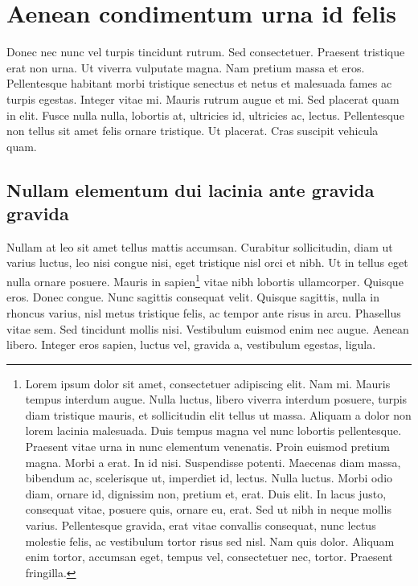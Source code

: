 \section{Aenean condimentum urna id felis}
Donec nec nunc vel turpis tincidunt rutrum. Sed consectetuer. Praesent tristique erat non urna. Ut viverra vulputate magna. Nam pretium massa et eros. Pellentesque habitant morbi tristique senectus et netus et malesuada fames ac turpis egestas. Integer vitae mi. Mauris rutrum augue et mi. Sed placerat quam in elit. Fusce nulla nulla, lobortis at, ultricies id, ultricies ac, lectus. Pellentesque non tellus sit amet felis ornare tristique. Ut placerat. Cras suscipit vehicula quam.

\subsection{Nullam elementum dui lacinia ante gravida gravida}
Nullam at leo sit amet tellus mattis accumsan. Curabitur sollicitudin, diam ut varius luctus, leo nisi congue nisi, eget tristique nisl orci et nibh. Ut in tellus eget nulla ornare posuere. Mauris in sapien\footnote{Lorem ipsum dolor sit amet, consectetuer adipiscing elit. Nam mi. Mauris tempus interdum augue. Nulla luctus, libero viverra interdum posuere, turpis diam tristique mauris, et sollicitudin elit tellus ut massa. Aliquam a dolor non lorem lacinia malesuada. Duis tempus magna vel nunc lobortis pellentesque. Praesent vitae urna in nunc elementum venenatis. Proin euismod pretium magna. Morbi a erat. In id nisi. Suspendisse potenti. Maecenas diam massa, bibendum ac, scelerisque ut, imperdiet id, lectus. Nulla luctus. Morbi odio diam, ornare id, dignissim non, pretium et, erat. Duis elit. In lacus justo, consequat vitae, posuere quis, ornare eu, erat. Sed ut nibh in neque mollis varius. Pellentesque gravida, erat vitae convallis consequat, nunc lectus molestie felis, ac vestibulum tortor risus sed nisl. Nam quis dolor. Aliquam enim tortor, accumsan eget, tempus vel, consectetuer nec, tortor. Praesent fringilla.} vitae nibh lobortis ullamcorper. Quisque eros. Donec congue. Nunc sagittis consequat velit. Quisque sagittis, nulla in rhoncus varius, nisl metus tristique felis, ac tempor ante risus in arcu. Phasellus vitae sem. Sed tincidunt mollis nisi. Vestibulum euismod enim nec augue. Aenean libero. Integer eros sapien, luctus vel, gravida a, vestibulum egestas, ligula.

